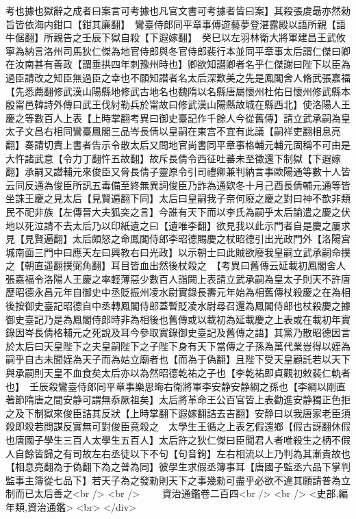 考也據也獄辭之成者曰案言可考據也凡官文書可考據者皆曰案】其殺張䖍朂亦然勑旨皆依海内鉗口【鉗其廉翻】　鸞臺侍郎同平章事傅遊藝夢登湛露殿以語所親【語牛倨翻】所親告之壬辰下獄自殺【下遐嫁翻】　癸巳以左羽林衛大將軍建昌王武攸寧為納言洛州司馬狄仁傑為地官侍郎與冬官侍郎裴行本並同平章事太后謂仁傑曰卿在汝南甚有善政【謂垂拱四年刺豫州時也】卿欲知譛卿者名乎仁傑謝曰陛下以臣為過臣請改之知臣無過臣之幸也不願知譛者名太后深歎美之先是鳳閣舍人脩武張嘉福【先悉薦翻修武漢山陽縣地修武古地名也魏隋以名縣唐屬懷州杜佑日懷州修武縣本殷甯邑韓詩外傳曰武王伐紂勒兵於甯故曰修武漢山陽縣故城在縣西北】使洛陽人王慶之等數百人上表【上時掌翻考異曰御史臺記作千餘人今從舊傳】請立武承嗣為皇太子文昌右相同鸞臺鳳閣三品岑長倩以皇嗣在東宫不宜有此議【嗣祥吏翻相息亮翻】奏請切責上書者告示令散太后又問地官尚書同平章事格輔元輔元固稱不可由是大忤諸武意【令力丁翻忤五故翻】故斥長倩令西征吐蕃未至徵還下制獄【下遐嫁翻】承嗣又譛輔元來俊臣又脅長倩子靈原令引司禮卿兼判納言事歐陽通等數十人皆云同反通為俊臣所訊五毒備至終無異詞俊臣乃詐為通欵冬十月己酉長倩輔元通等皆坐誅王慶之見太后【見賢遍翻下同】太后曰皇嗣我子奈何廢之慶之對曰神不歆非類民不祀非族【左傳晉大夫狐突之言】今誰有天下而以李氏為嗣乎太后諭遣之慶之伏地以死泣請不去太后乃以印紙遺之曰【遺唯李翻】欲見我以此示門者自是慶之屢求見【見賢遍翻】太后頗怒之命鳳閣侍郎李昭德賜慶之杖昭德引出光政門外【洛陽宫城南面三門中曰應天左曰興教右曰光政】以示朝士曰此賊欲廢我皇嗣立武承嗣命撲之【朝直遥翻撲弼角翻】耳目皆血出然後杖殺之　【考異曰舊傳云延載初鳳閣舍人張嘉福令洛陽人王慶之率輕薄惡少數百人詣闕上表請立武承嗣為皇太子則天不許唐歷昭德永昌元年自御史中丞貶振州凌水尉實錄長夀元年始為相舊傳杖殺慶之在為相後按御史臺記昭德自中丞轉鳳閣侍郎蓋暫貶凌水尉尋召還為鳳閣侍郎也杖殺慶之據御史臺記乃是為鳳閣侍郎時非為相後也舊傳或以載初為延載慶之上表或在載初年實錄因岑長倩格輔元之死說及耳今參取實錄御史臺記及舊傳之語】其黨乃散昭德因言於太后曰天皇陛下之夫皇嗣陛下之子陛下身有天下當傳之子孫為萬代業豈得以姪為嗣乎自古未聞姪為天子而為姑立廟者也【而為于偽翻】且陛下受天皇顧託若以天下與承嗣則天皇不血食矣太后亦以為然昭德乾祐之子也【李乾祐即貞觀初敕裴仁軌者也】　壬辰殺鸞臺侍郎同平章事樂思晦右衛將軍李安静安静綱之孫也【李綱以剛直著節隋唐之間安静可謂無忝厥祖矣】太后將革命王公百官皆上表勸進安静獨正色拒之及下制獄來俊臣詰其反狀【上時掌翻下遐嫁翻詰去吉翻】安静曰以我唐家老臣須殺即殺若問謀反實無可對俊臣竟殺之　太學生王循之上表乞假還鄉【假古訝翻休假也唐國子學生三百人太學生五百人】太后許之狄仁傑曰臣聞君人者唯殺生之柄不假人自餘皆歸之有司故左右丞徒以下不句【句音鉤】左右相流以上乃判為其漸貴故也【相息亮翻為于偽翻下為之普為同】彼學生求假丞簿事耳【唐國子監丞六品下掌判監事主簿從七品下】若天子為之發勑則天下之事幾勑可盡乎必欲不違其願請普為立制而已太后善之<br />
<br />
　　資治通鑑卷二百四<br />
<br />
<史部,編年類,資治通鑑>  <br>
   </div> 

